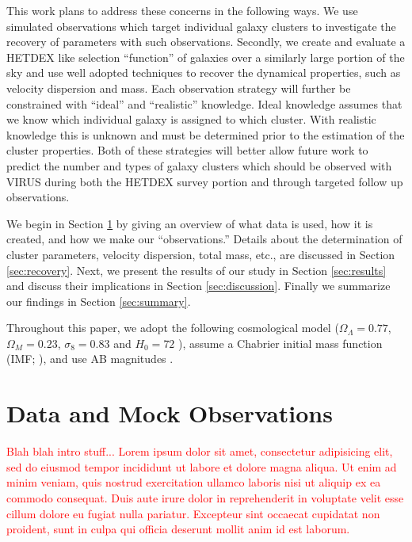 \documentclass[fleqn,usenatbib]{mnras}
\newcommand{\editorial}[1]{\textcolor{red}{#1}}
\begin{document}
This work plans to address these concerns in the following ways. We use simulated observations which target individual galaxy clusters to investigate the recovery of parameters with such observations. Secondly, we create and evaluate a HETDEX like selection ``function'' of galaxies over a similarly large portion of the sky and use well adopted techniques to recover the dynamical properties, such as velocity dispersion and mass. Each observation strategy will further be constrained with ``ideal'' and ``realistic'' knowledge. Ideal knowledge assumes that we know which individual galaxy is assigned to which cluster. With realistic knowledge this is unknown and must be determined prior to the estimation of the cluster properties. Both of these strategies will better allow future work to predict the number and types of galaxy clusters which should be observed with VIRUS during both the HETDEX survey portion and through targeted follow up observations.

We begin in Section \ref{sec:Data} by giving an overview of what data is used, how it is created, and how we make our ``observations.'' Details about the determination of cluster parameters, velocity dispersion, total mass, etc., are discussed in Section \ref{sec:recovery}. Next, we present the results of our study in Section \ref{sec:results} and discuss their implications in Section \ref{sec:discussion}. Finally we summarize our findings in Section \ref{sec:summary}.

Throughout this paper, we adopt the following cosmological model ($\Omega_\Lambda = 0.77$,
$\Omega_M = 0.23$, $\sigma_8 = 0.83$ and $H_0= 72$ \kms \mpc), assume a Chabrier initial mass function (IMF; \citealt{Chabrier2003}), and use AB magnitudes \citep{Oke1974}.

\section{Data and Mock Observations}\label{sec:Data}

\editorial{Blah blah intro stuff... Lorem ipsum dolor sit amet, consectetur adipisicing elit, sed do eiusmod tempor incididunt ut labore et dolore magna aliqua. Ut enim ad minim veniam, quis nostrud exercitation ullamco laboris nisi ut aliquip ex ea commodo consequat. Duis aute irure dolor in reprehenderit in voluptate velit esse cillum dolore eu fugiat nulla pariatur. Excepteur sint occaecat cupidatat non proident, sunt in culpa qui officia deserunt mollit anim id est laborum.}
\end{document}

